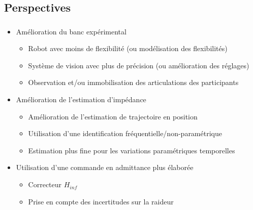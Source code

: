 \documentclass[10pt,xcolor=table]{beamer}
\begin{document}
\subsection{Perspectives}
\begin{frame}
	\frametitle{\insertsubsection}
	\begin{itemize}[<+->]
		\item Amélioration du banc expérimental 
		\begin{itemize}
			\item Robot avec moins de flexibilité (ou modélisation des flexibilités)
			\item Système de vision avec plus de précision (ou amélioration des réglages)
			\item Observation et/ou immobilisation des articulations des participants
		\end{itemize}
		\item Amélioration de l'estimation d'impédance
		\begin{itemize}
			\item Amélioration de l'estimation de trajectoire en position
			\item Utilisation d'une identification fréquentielle/non-paramétrique
			\item [$\Rightarrow$] Estimation plus fine pour les variations paramétriques temporelles
		\end{itemize}
		\item Utilisation d'une commande en admittance plus élaborée
		\begin{itemize}
			\item Correcteur $H_{inf}$
			\item Prise en compte des incertitudes sur la raideur
		\end{itemize}
	\end{itemize}
\end{frame}
\end{document}
